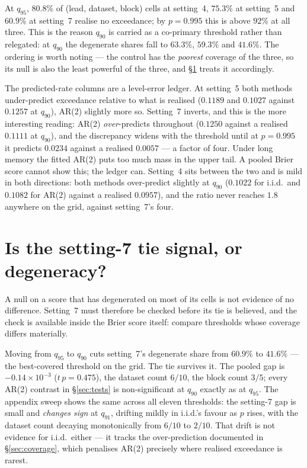 \documentclass[11pt]{article}
\newcommand{\tblpath}{../../code/analysis/time_block_forecast/simstudy/output/tables}
\newcommand{\tbl}[1]{}
\begin{document}
\tbl{expA_coverage}

\noindent At $q_{95}$, $80.8\%$ of (lead, dataset, block) cells at
setting~4, $75.3\%$ at setting~5 and $60.9\%$ at setting~7 realise no
exceedance; by $p = 0.995$ this is above $92\%$ at all three. This is the
reason $q_{90}$ is carried as a co-primary threshold rather than
relegated: at $q_{90}$ the degenerate shares fall to $63.3\%$, $59.3\%$
and $41.6\%$. The ordering is worth noting --- the control has the
\emph{poorest} coverage of the three, so its null is also the least
powerful of the three, and \S\ref{sec:tie} treats it accordingly.

The predicted-rate columns are a level-error ledger. At setting~5 both
methods under-predict exceedance relative to what is realised
($0.1189$ and $0.1027$ against $0.1257$ at $q_{90}$), AR(2) slightly more
so. Setting~7 inverts, and this is the more interesting reading: AR(2)
\emph{over}-predicts throughout ($0.1250$ against a realised $0.1111$ at
$q_{90}$), and the discrepancy widens with the threshold until at
$p = 0.995$ it predicts $0.0234$ against a realised $0.0057$ --- a
factor of four. Under long memory the fitted AR(2) puts too much mass in
the upper tail. A pooled Brier score cannot show this; the ledger can.
Setting~4 sits between the two and is mild in both directions: both
methods over-predict slightly at $q_{90}$ ($0.1022$ for i.i.d.\ and
$0.1082$ for AR(2) against a realised $0.0957$), and the ratio never
reaches $1.8$ anywhere on the grid, against setting~7's four.

\section{Is the setting-7 tie signal, or degeneracy?}
\label{sec:tie}

A null on a score that has degenerated on most of its cells is not
evidence of no difference. Setting~7 must therefore be checked before its
tie is believed, and the check is available inside the Brier score
itself: compare thresholds whose coverage differs materially.

Moving from $q_{95}$ to $q_{90}$ cuts setting~7's degenerate share from
$60.9\%$ to $41.6\%$ --- the best-covered threshold on the grid. The tie
survives it. The pooled gap is $-0.14 \times 10^{-3}$ ($t\,p = 0.475$),
the dataset count $6/10$, the block count $3/5$; every AR(2) contrast in
\S\ref{sec:tests} is non-significant at $q_{90}$ exactly as at $q_{95}$.
The appendix sweep shows the same across all eleven thresholds: the
setting-7 gap is small and \emph{changes sign} at $q_{91}$, drifting
mildly in i.i.d.'s favour as $p$ rises, with the dataset count decaying
monotonically from $6/10$ to $2/10$. That drift is not evidence for
i.i.d.\ either --- it tracks the over-prediction documented in
\S\ref{sec:coverage}, which penalises AR(2) precisely where realised
exceedance is rarest.
\end{document}
